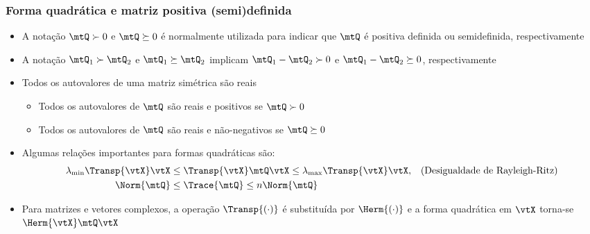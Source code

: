 \begin{frame}
  \frametitle{Forma quadrática e matriz positiva (semi)definida}
  \begin{itemize}
    \item A notação $\mtQ \succ 0$ e $\mtQ \succeq 0$ é normalmente utilizada para indicar que $\mtQ$ é positiva definida ou semidefinida, respectivamente
    \item A notação $\mtQ_1 \succ \mtQ_2$ e $\mtQ_1 \succeq \mtQ_2$ implicam $\mtQ_1 - \mtQ_2 \succ 0$ e $\mtQ_1 - \mtQ_2 \succeq 0$, respectivamente
    \item Todos os autovalores de uma matriz simétrica são reais
    \begin{itemize}
      \item Todos os autovalores de $\mtQ$ são reais e positivos se $\mtQ \succ 0$
      \item Todos os autovalores de $\mtQ$ são reais e não-negativos se $\mtQ \succeq 0$
    \end{itemize}
    \item Algumas relações importantes para formas quadráticas são:
    {\small \begin{subequations}
      \begin{align}
        \lambda_{\min}\Transp{\vtX}\vtX &\leq \Transp{\vtX}\mtQ\vtX \leq \lambda_{\max}\Transp{\vtX}\vtX, & \text{(Desigualdade de Rayleigh-Ritz)}\\
        \Norm{\mtQ} & \leq \Trace{\mtQ} \leq n \Norm{\mtQ}
      \end{align}
    \end{subequations}}
    \item Para matrizes e vetores complexos, a operação $\Transp{(\cdot)}$ é substituída por $\Herm{(\cdot)}$ e a forma quadrática em $\vtX$ torna-se $\Herm{\vtX}\mtQ\vtX$
  \end{itemize}
\end{frame}

